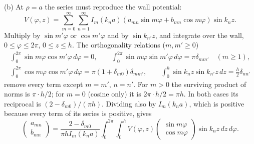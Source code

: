 (b) At $\rho=a$ the series must reproduce the wall potential:
\[
V(\varphi,z)=\sum_{m=0}^\infty\sum_{n=1}^\infty I_m(k_na)
(a_{mn}\sin m\varphi+b_{mn}\cos m\varphi)\sin k_nz.
\]
Multiply by $\sin m'\varphi$ or $\cos m'\varphi$ and by
$\sin k_{n'}z$, and integrate over the wall, $0\le\varphi\le2\pi$,
$0\le z\le h$. The orthogonality relations ($m,m'\ge0$)
\begin{gather*}
\int_0^{2\pi}\sin m\varphi\cos m'\varphi\,d\varphi=0,\qquad
\int_0^{2\pi}\sin m\varphi\sin m'\varphi\,d\varphi
=\pi\delta_{mm'}\quad(m\ge1),\\
\int_0^{2\pi}\cos m\varphi\cos m'\varphi\,d\varphi
=\pi(1+\delta_{m0})\delta_{mm'},\qquad
\int_0^h\sin k_nz\sin k_{n'}z\,dz=\frac h2\delta_{nn'}
\end{gather*}
remove every term except $m=m'$, $n=n'$. For $m>0$ the surviving
product of norms is $\pi\cdot h/2$; for $m=0$ (cosine only) it is
$2\pi\cdot h/2=\pi h$. In both cases its reciprocal is
$(2-\delta_{m0})/(\pi h)$. Dividing also by $I_m(k_na)$, which is
positive because every term of its series is positive, gives
\[
\boxed{\begin{pmatrix}a_{mn}\\b_{mn}\end{pmatrix}
=\frac{2-\delta_{m0}}{\pi h I_m(k_na)}
\int_0^{2\pi}\!\int_0^hV(\varphi,z)
\begin{pmatrix}\sin m\varphi\\\cos m\varphi\end{pmatrix}
\sin k_nz\,dz\,d\varphi}.
\]

